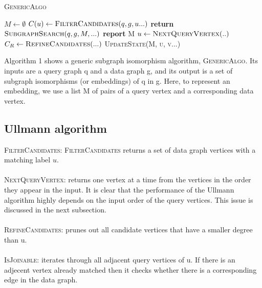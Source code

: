 \documentclass[
10pt, %
a4paper, %
oneside, %
headinclude,footinclude, %
BCOR5mm, %
]{scrartcl}
\begin{document}
\begin{algorithm}
\caption{\textsc{GenericAlgo}}\label{euclid}
\begin{algorithmic}[1]
\State $M \gets \emptyset$
\State $C(u) \gets \textsc{FilterCandidates}(q, g, u...)$
\State \textbf{return}
\EndIf
\EndFor
\State $\textsc{SubgraphSearch}(q, g, M,...)$ 
    \State \textbf{report} M
    \Else
    \State $u \gets \textsc{NextQueryVertex}(..)$
    \State $C_R \gets \textsc{RefineCandidates}(...)$
            \State \textsc{UpdateState(M, u, v...)}
        \EndIf
    \EndFor
\EndIf
\EndProcedure
\end{algorithmic}
\end{algorithm}

Algorithm 1 shows a generic subgraph isomorphism algorithm, \textsc{GenericAlgo}. Its inputs are a query graph q and a data graph g, and its output is a set of subgraph isomorphisms (or embeddings) of q in g. Here, to represent an embedding, we use a list M of pairs of a query vertex and a corresponding data vertex.


\subsection{Ullmann algorithm}
\textsc{FilterCandidates:} \textsc{FilterCandidates} returns a set of data graph vertices with a matching label $u$.\\
\\
\textsc{NextQueryVertex:} returns one vertex at a time from the vertices in the order they appear in the input. It is clear that the performance of the Ullmann algorithm highly depends on the input order of the query vertices. This issue is discussed in the next subsection.\\
\\
\textsc{RefineCandidates:} prunes out all candidate vertices that have a smaller degree than u.\\
\\
\textsc{IsJoinable:} iterates through all adjacent query vertices of u. If there is an adjecent vertex already matched then it checks whether there is a corresponding edge in the data graph.
\end{document}
